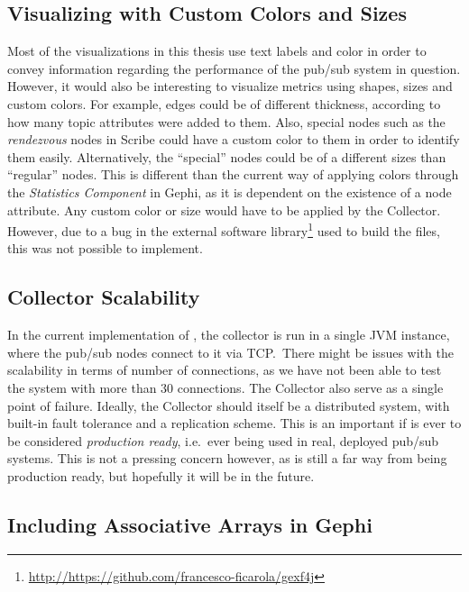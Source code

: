 \subsection{Visualizing with Custom Colors and Sizes}

Most of the visualizations in this thesis use text labels and color in
order to convey information regarding the performance of the pub/sub
system in question. However, it would also be interesting to visualize
metrics using shapes, sizes and custom colors. For example, edges could
be of different thickness, according to how many topic attributes were
added to them. Also, special nodes such as the \emph{rendezvous} nodes
in Scribe could have a custom color to them in order to identify them
easily. Alternatively, the ``special'' nodes could be of a different
sizes than ``regular'' nodes. This is different than the current way of
applying colors through the \emph{Statistics Component} in Gephi, as it
is dependent on the existence of a node attribute. Any custom color or
size would have to be applied by the Collector. However, due to a bug in
the external software
library\footnote{\url{http://https://github.com/francesco-ficarola/gexf4j}}
used to build the \gexf{} files, this was not possible to implement.


\subsection{Collector Scalability}

In the current implementation of \demo{}, the collector is run in a
single JVM instance, where the pub/sub nodes connect to it via TCP.\
There might be issues with the scalability in terms of number of
connections, as we have not been able to test the system with more than
30 connections. The Collector also serve as a single point of failure.
Ideally, the Collector should itself be a distributed system, with
built-in fault tolerance and a replication scheme. This is an important
if \demo{} is ever to be considered \emph{production ready}, i.e.\ ever
being used in real, deployed pub/sub systems. This is not a pressing
concern however, as \demo{} is still a far way from being production
ready, but hopefully it will be in the future.

\subsection{Including Associative Arrays in Gephi}

